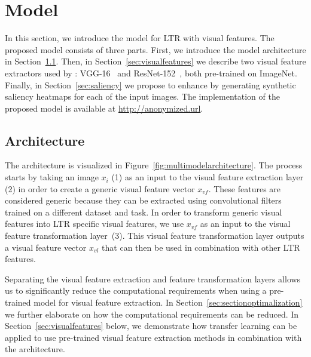 
\section{\protect\modelname{} Model}
In this section, we introduce the \modelname{} model for \ac{LTR} with visual features.
The proposed model consists of three parts.
First, we introduce the model architecture in Section~\ref{sec:multimodal}.
Then, in Section~\ref{sec:visualfeatures} we describe two visual feature extractors used by \modelname{}:
VGG-16~\cite{simonyan2014very} and ResNet-152~\cite{he2016deep}, both pre-trained on ImageNet.
Finally, in Section~\ref{sec:saliency} we propose to enhance \modelname{} by generating synthetic saliency heatmaps for each of the input images.
 The implementation of the proposed \modelname{} model is available at \url{http://anonymized.url}.

\subsection{Architecture} \label{sec:multimodal}
The \modelname{} architecture is visualized in Figure~\ref{fig:multimodelarchitecture}. 
The process starts by taking an image $x_i$ (1) as an input to the visual feature extraction layer (2) in order to create a generic visual feature vector $x_{vf}$. 
These features are considered generic because they can be extracted using convolutional filters trained on a different dataset and task. 
In order to transform generic visual features into \ac{LTR} specific visual features, we use $x_{vf}$ as an input to the visual feature transformation layer~(3).
This visual feature transformation layer outputs a visual feature vector $x_{vl}$ that can then be used in combination with other \ac{LTR} features. 

Separating the visual feature extraction and feature transformation layers allows us to significantly reduce the computational requirements when using a pre-trained model for visual feature extraction. 
In Section~\ref{sec:sectionoptimalization} we further elaborate on how the computational requirements can be reduced.
In Section~\ref{sec:visualfeatures} below, we demonstrate how transfer learning can be applied to use pre-trained visual feature extraction methods in combination with the \modelname{} architecture.

